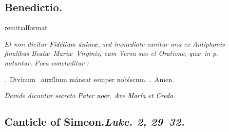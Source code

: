 \documentclass[12pt]{article} %
\newcommand{\myaboveinitial}[1]{%
    \expandafter\renewcommand\csname greinitialformat\endcsname[1]{%
        \fontsize{43}{43}\selectfont ##1
    }
    \gresetfirstlineaboveinitial{\textcolor{benred8}{\raisebox{6.0mm}{\small \textsc{\textbf{#1}}}}}{}
}
\newenvironment{rubric}{\vspace{1 mm}\color{benred8} \itshape \leftskip 0in \setlength{\parindent}{0.25in}}{\vspace{1 mm}}
\newenvironment{response}{\leftskip 0in \setlength{\parindent}{0in}}{\vspace{1 mm}}
\let\oldVbar\Vbar
\renewcommand{\Vbar}{\textcolor{benred8}{\oldVbar .}}
\let\oldRbar\Rbar
\renewcommand{\Rbar}{\textcolor{benred8}{\oldRbar .}}
\let\oldgrealtcross\grealtcross
\renewcommand{\grealtcross}{\textcolor{benred8}{\oldgrealtcross}}
\def\capitulumSpace{\hspace{20 mm}}
\begin{document}
\begin{pages}
\begin{Leftside}
\subsection*{Benedictio.}

\pend\pstart


\myaboveinitial{}

\pend\pstart

\begin{rubric}
Et non dicitur \textcolor{black}{\emph{Fid\'{e}lium \'{a}nim\ae}}, sed immediate canitur una ex Antiphonis finalibus Beat\ae\ Mari\ae\ Virginis, cum Versu suo et Oratione, qu\ae\ in p.~\pageref{sec:AntBMV} notantur. Poea concluditur :

\end{rubric}

\pend\pstart

\begin{response}
\Vbar\ Div\'{i}num \grealtcross\ aux\'{i}lium m\'{a}neat semper nob\'{i}scum. \Rbar\ Amen.

\end{response}

\pend\pstart

\begin{rubric}
Deinde dicuntur secreto \textcolor{black}{\emph{Pater noer}}, \textcolor{black}{\emph{Ave Mar\'{i}a}} et \textcolor{black}{\emph{Credo}}.

\end{rubric}

\pend\endnumbering
\end{Leftside}
\begin{Rightside}

\beginnumbering\pstart


\subsection*{Canticle of Simeon.\capitulumSpace \emph{Luke. 2, 29--32.}}

\pend\pstart



\end{Rightside}
\end{pages}
\end{document}
